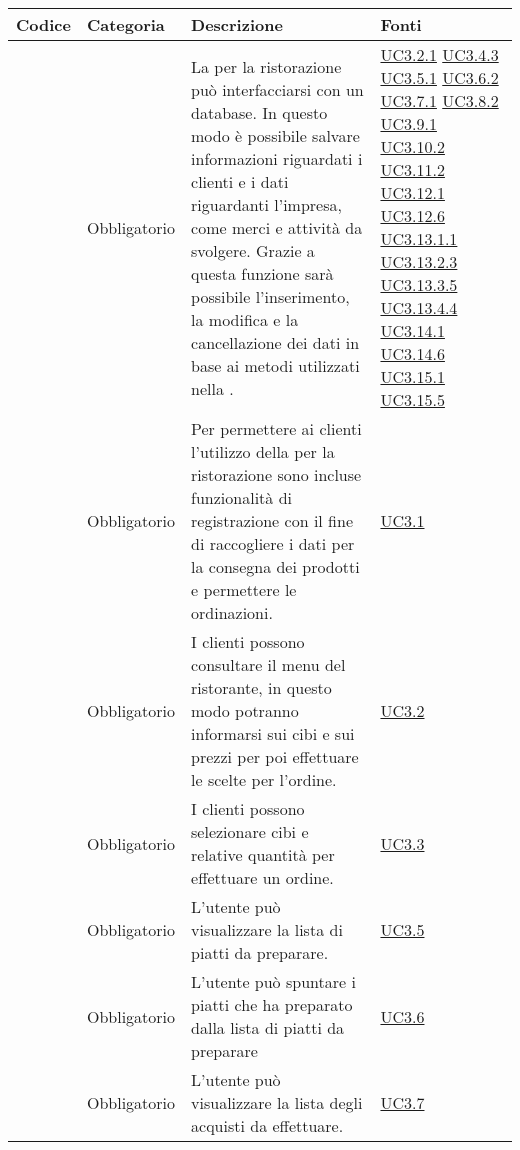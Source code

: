 \begin{longtable}{|P{1.5cm}|P{2.5cm}|P{6.5cm}|P{2.5cm}|}
	\hline \textbf{Codice} & \textbf{Categoria} & \textbf{Descrizione} & \textbf{Fonti} \\
	\hline \RequisitoObF\label{L21} & Obbligatorio & La  per la ristorazione può interfacciarsi con un database. In questo modo è possibile salvare informazioni riguardati i clienti e i dati riguardanti l'impresa, come merci e attività da svolgere. Grazie a questa funzione sarà possibile l'inserimento, la modifica e la cancellazione dei dati in base ai metodi utilizzati nella . & \hyperref[UC3.2.1]{UC3.2.1} \hyperref[UC3.4.3]{UC3.4.3} \hyperref[UC3.5.1]{UC3.5.1} \hyperref[UC3.6.2]{UC3.6.2} \hyperref[UC3.7.1]{UC3.7.1} \hyperref[UC3.8.2]{UC3.8.2} \hyperref[UC3.9.1]{UC3.9.1} \hyperref[UC3.10.2]{UC3.10.2} \hyperref[UC3.11.2]{UC3.11.2} \hyperref[UC3.12.1]{UC3.12.1} \hyperref[UC3.12.6]{UC3.12.6} \hyperref[UC3.13.1.1]{UC3.13.1.1} \hyperref[UC3.13.2.3]{UC3.13.2.3} \hyperref[UC3.13.3.5]{UC3.13.3.5} \hyperref[UC3.13.4.4]{UC3.13.4.4} \hyperref[UC3.14.1]{UC3.14.1} \hyperref[UC3.14.6]{UC3.14.6} \hyperref[UC3.15.1]{UC3.15.1} \hyperref[UC3.15.5]{UC3.15.5} \\
	\hline \RequisitoObF\label{L22} & Obbligatorio & Per permettere ai clienti l'utilizzo della  per la ristorazione sono incluse funzionalità di registrazione con il fine di raccogliere i dati per la consegna dei prodotti e permettere le ordinazioni. & \hyperref[UC3.1]{UC3.1} \\
	\hline \RequisitoObF\label{L23} & Obbligatorio & I clienti possono consultare il menu del ristorante, in questo modo potranno informarsi sui cibi e sui prezzi per poi effettuare le scelte per l'ordine. & \hyperref[UC3.2]{UC3.2} \\
	\hline \RequisitoObF\label{L24} & Obbligatorio & I clienti possono selezionare cibi e relative quantità per effettuare un ordine. & \hyperref[UC3.3]{UC3.3} \\
	\hline \RequisitoObF\label{L25} & Obbligatorio & L'utente  può visualizzare la lista di piatti da preparare. & \hyperref[UC3.5]{UC3.5} \\
	\hline \RequisitoObF\label{L26} & Obbligatorio & L'utente  può spuntare i piatti che ha preparato dalla lista di piatti da preparare  & \hyperref[UC3.6]{UC3.6} \\
	\hline \RequisitoObF\label{L27} & Obbligatorio & L'utente  può visualizzare la lista degli acquisti da effettuare. & \hyperref[UC3.7]{UC3.7} \\

\end{longtable}
